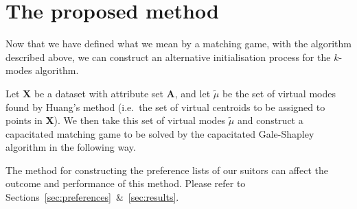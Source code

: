 \section{The proposed method}\label{sec:proposed-method}

Now that we have defined what we mean by a matching game, with the algorithm 
described above, we can construct an alternative initialisation process for the 
\(k\)-modes algorithm.

Let \textbf{X} be a dataset with attribute set \textbf{A}, and let
\(\tilde{\mu}\) be the set of virtual modes found by Huang's method (i.e.\ the
set of virtual centroids to be assigned to points in \textbf{X}). We then take
this set of virtual modes \(\tilde{\mu}\) and construct a capacitated matching
game to be solved by the capacitated Gale-Shapley algorithm in the following
way.

\begin{singlespace}
    
\end{singlespace}

\begin{remark}
    The method for constructing the preference lists of our suitors can affect
    the outcome and performance of this method. Please refer to
    Sections~\ref{sec:preferences}~\&~\ref{sec:results}.
\end{remark}
